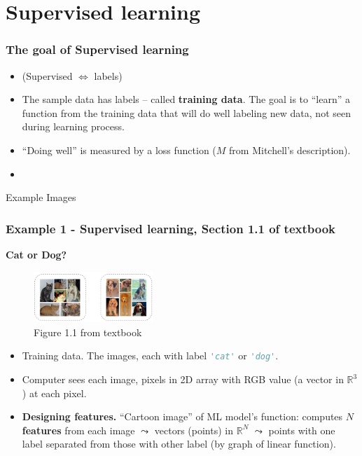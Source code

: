 \documentclass{beamer}
\theoremstyle{example}
\newcommand{\ct}[1]{\lstinline[language=Python]!#1!}
\newcommand{\bb}[1]{\mathbb{#1}}
\begin{document}
\section{Supervised learning}

\begin{frame}
\frametitle{The goal of Supervised learning}
\begin{itemize}
    \item (Supervised $\iff$ labels) 
    \item The sample data has labels {--} called \textbf{training data}. The goal is to ``learn'' a function from the training data that will do well labeling new data, not seen during learning process. 
    \item ``Doing well'' is measured by a loss function ($M$ from Mitchell's description). 
    \item {}
\end{itemize}
\end{frame}

\begin{frame}[standout]
    Example Images
\end{frame}

\begin{frame}
\frametitle{Example 1 - Supervised learning, Section 1.1 of textbook}
\textbf{Cat or Dog?}

\begin{figure}
\includegraphics[width=0.4\textwidth]{../../Images/Fig1-1.png}
\caption*{Figure 1.1 from textbook}
\end{figure}

\begin{itemize}
    \item Training data. The images, each with label \ct{'cat'} or \ct{'dog'}.
    \item Computer sees each image, pixels in 2D array with RGB value (a vector in $\bb R^3$) at each pixel.
    \item \textbf{Designing features.} ``Cartoon image'' of ML model's function: computes $N$ \textbf{features} from each image $\leadsto$ vectors (points) in $\bb R^N$ $\leadsto$ points with one label separated from those with other label (by graph of linear function).
\end{itemize}
\end{frame}
\end{document}
